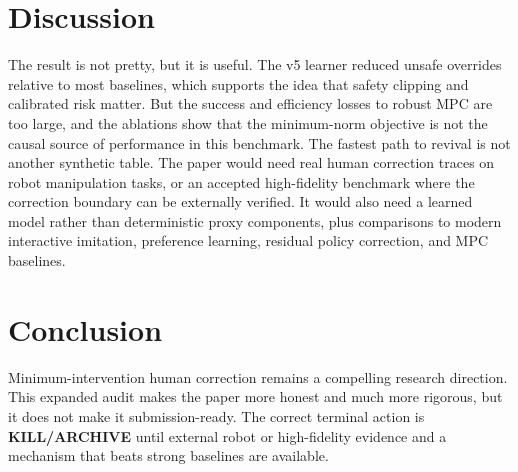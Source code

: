 \documentclass{article}
\begin{document}
\section{Discussion}
The result is not pretty, but it is useful. The v5 learner reduced unsafe overrides relative to most baselines, which supports the idea that safety clipping and calibrated risk matter. But the success and efficiency losses to robust MPC are too large, and the ablations show that the minimum-norm objective is not the causal source of performance in this benchmark.
The fastest path to revival is not another synthetic table. The paper would need real human correction traces on robot manipulation tasks, or an accepted high-fidelity benchmark where the correction boundary can be externally verified. It would also need a learned model rather than deterministic proxy components, plus comparisons to modern interactive imitation, preference learning, residual policy correction, and MPC baselines.
\section{Conclusion}
Minimum-intervention human correction remains a compelling research direction. This expanded audit makes the paper more honest and much more rigorous, but it does not make it submission-ready. The correct terminal action is \textbf{KILL/ARCHIVE} until external robot or high-fidelity evidence and a mechanism that beats strong baselines are available.
\clearpage
\appendix
\end{document}
